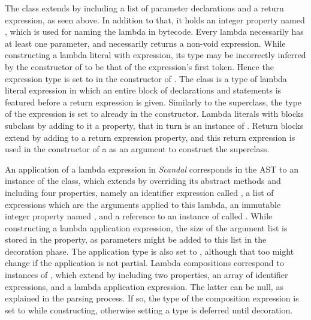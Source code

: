 The  class extends  by including a list of parameter declarations and a return expression, as seen above. In addition to that, it holds an integer property named , which is used for naming the lambda in bytecode. Every lambda necessarily has at least one parameter, and necessarily returns a non-void expression. While constructing a lambda literal with expression, its type may be incorrectly inferred by the constructor of  to be that of the expression's first token. Hence the expression type is set to  in the constructor of . The  class is a type of lambda literal expression in which an entire block of declarations and statements is featured before a return expression is given. Similarly to the superclass, the type of the expression is set to  already in the constructor. Lambda literals with blocks subclass  by adding to it a  property, that in turn is an instance of . Return blocks extend  by adding to  a return expression property, and this return expression is used in the constructor of a  as an argument to construct the  superclass.

An application of a lambda expression in \emph{Scandal} corresponds in the AST to an instance of the  class, which extends  by overriding its abstract methods and including four properties, namely an identifier expression called , a list of expressions which are the arguments applied to this lambda, an immutable integer property named , and a reference to an instance of  called . While constructing a lambda application expression, the size of the argument list is stored in the  property, as parameters might be added to this list in the decoration phase. The application type is also set to , although that too might change if the application is not partial. Lambda compositions correspond to instances of , which extend  by including two properties, an array of identifier expressions, and a lambda application expression. The latter can be null, as explained in the parsing process. If so, the type of the composition expression is set to  while constructing, otherwise setting a type is deferred until decoration.